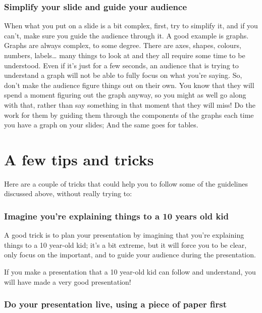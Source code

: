 \documentclass[
]{book}
\begin{document}
\hypertarget{simplify-your-slide-and-guide-your-audience}{%
\subsubsection{Simplify your slide and guide your audience}\label{simplify-your-slide-and-guide-your-audience}}

When what you put on a slide is a bit complex, first, try to simplify it, and if you can't, make sure you guide the audience through it. A good example is graphs. Graphs are always complex, to some degree. There are axes, shapes, colours, numbers, labels\ldots{} many things to look at and they all require some time to be understood. Even if it's just for a few seconds, an audience that is trying to understand a graph will not be able to fully focus on what you're saying. So, don't make the audience figure things out on their own. You know that they will spend a moment figuring out the graph anyway, so you might as well go along with that, rather than say something in that moment that they will miss! Do the work for them by guiding them through the components of the graphs each time you have a graph on your slides; And the same goes for tables.

\hypertarget{a-few-tips-and-tricks}{%
\section{A few tips and tricks}\label{a-few-tips-and-tricks}}

Here are a couple of tricks that could help you to follow some of the guidelines discussed above, without really trying to:

\hypertarget{imagine-youre-explaining-things-to-a-10-years-old-kid}{%
\subsubsection{Imagine you're explaining things to a 10 years old kid}\label{imagine-youre-explaining-things-to-a-10-years-old-kid}}

A good trick is to plan your presentation by imagining that you're explaining things to a 10 year-old kid; it's a bit extreme, but it will force you to be clear, only focus on the important, and to guide your audience during the presentation.

If you make a presentation that a 10 year-old kid can follow and understand, you will have made a very good presentation!

\hypertarget{do-your-presentation-live-using-a-piece-of-paper-first}{%
\subsubsection{Do your presentation live, using a piece of paper first}\label{do-your-presentation-live-using-a-piece-of-paper-first}}
\end{document}
